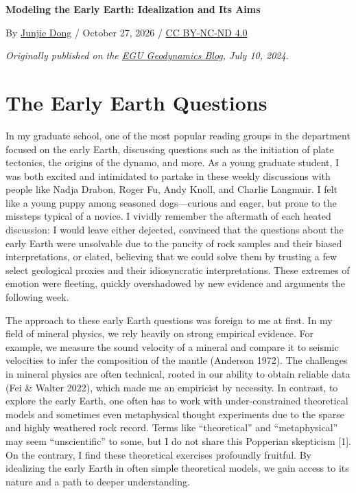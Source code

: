 \documentclass[11pt]{article}
\begin{document}
{\LARGE\bfseries Modeling the Early Earth: Idealization and Its Aims\par}
\medskip

By \href{https://orcid.org/0000-0003-1114-9348}{Junjie Dong} / October 27, 2026 / \href{https://creativecommons.org/licenses/by-nc-nd/4.0/}{CC BY-NC-ND 4.0}

\emph{Originally published on the \href{https://blogs.egu.eu/divisions/gd/2024/07/10/modeling-the-early-earth-i/}{EGU Geodynamics Blog}, July 10, 2024.}

\section*{The Early Earth Questions}

In my graduate school, one of the most popular reading groups in the department focused on the early Earth, discussing questions such as the initiation of plate tectonics, the origins of the dynamo, and more. As a young graduate student, I was both excited and intimidated to partake in these weekly discussions with people like Nadja Drabon, Roger Fu, Andy Knoll, and Charlie Langmuir. I felt like a young puppy among seasoned dogs---curious and eager, but prone to the missteps typical of a novice. I vividly remember the aftermath of each heated discussion: I would leave either dejected, convinced that the questions about the early Earth were unsolvable due to the paucity of rock samples and their biased interpretations, or elated, believing that we could solve them by trusting a few select geological proxies and their idiosyncratic interpretations. These extremes of emotion were fleeting, quickly overshadowed by new evidence and arguments the following week.

The approach to these early Earth questions was foreign to me at first. In my field of mineral physics, we rely heavily on strong empirical evidence. For example, we measure the sound velocity of a mineral and compare it to seismic velocities to infer the composition of the mantle (Anderson 1972). The challenges in mineral physics are often technical, rooted in our ability to obtain reliable data (Fei \& Walter 2022), which made me an empiricist by necessity. In contrast, to explore the early Earth, one often has to work with under-constrained theoretical models and sometimes even metaphysical thought experiments due to the sparse and highly weathered rock record. Terms like ``theoretical'' and ``metaphysical'' may seem ``unscientific'' to some, but I do not share this Popperian skepticism [1]. On the contrary, I find these theoretical exercises profoundly fruitful. By idealizing the early Earth in often simple theoretical models, we gain access to its nature and a path to deeper understanding.
\end{document}
